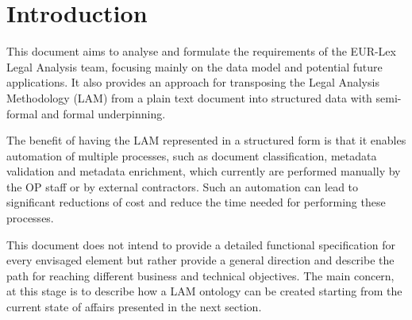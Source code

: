 \section{Introduction}\label{ariaid-title13}

This document aims to analyse and formulate the requirements of the
EUR-Lex Legal Analysis team, focusing mainly on the data model and potential future applications. It also provides an approach for transposing the Legal Analysis Methodology (LAM) from a plain text document into structured data with semi-formal and formal underpinning.

The benefit of having the LAM represented in a structured form is that it enables automation of multiple processes, such as document classification, metadata validation and metadata enrichment, which currently are performed manually by the OP staff or by external contractors. Such an automation can lead to significant reductions of cost and reduce the time needed for performing these processes.

This document does not intend to provide a detailed functional specification for every envisaged element but rather provide a general direction and describe the path for reaching different business and technical objectives. The main concern, at this stage is to describe how a LAM ontology can be created starting from the current state of affairs presented in the next section.

